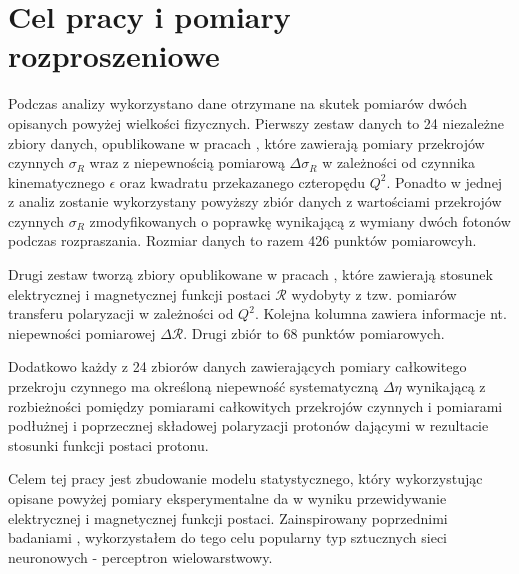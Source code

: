 \documentclass[11pt]{book}
\theoremstyle{definition}
\begin{document}
\section{Cel pracy i pomiary rozproszeniowe}
Podczas analizy wykorzystano dane otrzymane na skutek pomiarów dwóch opisanych powyżej wielkości fizycznych. Pierwszy zestaw danych to 24 niezależne zbiory danych, opublikowane w pracach \cite{1966PhRv..142..922J, 1966PhRvL..17..608B, 1967PhRvL..18.1014A, 1970PhLB...31...40L, 1970PhRvD...1.2449G, 1971PhLB...35...87B, 1971PhRvD...4...45P, 1974NuPhA.222..269B, 1973NuPhB..58..429B, 1973PhRvD...8...63K, 1993PhRvD..48...29S, 1994PhRvD..49.5671W, 1994PhRvD..50.5491A, 1975NuPhB..93..461B, 1975PhRvD..12.1884S, 1974PhRvC..10.2111M, 1980NuPhA.333..381S, 1981NuPhA.364..285S, 1992PhRvD..46...24R, 2003PhRvC..68f4603D, 2004PhRvC..70a5206C}, które zawierają pomiary przekrojów czynnych $\sigma_R$ wraz z niepewnością pomiarową $\Delta \sigma_R$ w zależności od czynnika kinematycznego $\epsilon$ oraz kwadratu przekazanego czteropędu $Q^2$. Ponadto w jednej z analiz zostanie wykorzystany powyższy zbiór danych z wartościami przekrojów czynnych $\sigma_R$ zmodyfikowanych o poprawkę wynikającą z wymiany dwóch fotonów podczas rozpraszania.  Rozmiar danych to razem 426 punktów pomiarowcyh. 

Drugi zestaw tworzą zbiory opublikowane w pracach \cite{1999PhRvL..82.2221M, 2000PhRvL..84.1398J, 2001PhLB..500...47D, 2001EPJA...12..125P, 2002PhRvL..88i2301G, 2001PhRvC..64c8202G, 2005PhRvC..71e5202P, 2006PhRvC..73f4004H, 2006NuPhA.764..261M, 2006PhRvC..74c5201J, 2007PhRvL..99t2002R, 2007PhRvL..98e2301C}, które zawierają stosunek elektrycznej i magnetycznej funkcji postaci $\mathcal{R}$ wydobyty z tzw. pomiarów transferu polaryzacji w zależności od $Q^2$. Kolejna kolumna zawiera informacje nt. niepewności pomiarowej $\Delta \mathcal{R}$. Drugi zbiór to 68 punktów pomiarowych.  

Dodatkowo każdy z 24 zbiorów danych zawierających pomiary całkowitego przekroju czynnego ma określoną niepewność systematyczną $\Delta \eta$ wynikającą z rozbieżności pomiędzy pomiarami całkowitych przekrojów czynnych i pomiarami podłużnej i poprzecznej składowej polaryzacji protonów dającymi w rezultacie stosunki funkcji postaci protonu. 

Celem tej pracy jest zbudowanie modelu statystycznego, który wykorzystując opisane powyżej pomiary eksperymentalne da w wyniku przewidywanie elektrycznej i magnetycznej funkcji postaci. Zainspirowany poprzednimi badaniami \cite{2009PhRvC..79f5204A}, \cite{PhysRevC.84.034314} wykorzystałem do tego celu popularny typ sztucznych sieci neuronowych - perceptron wielowarstwowy.
\end{document}
